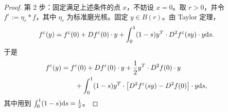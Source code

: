 \documentclass[../../main.tex]{subfiles}%
\begin{document}
\begin{proof}
第 2 步：固定满足上述条件的点 $x$，不妨设 $x=0$。取 $r>0$，并令 $f^{\varepsilon}:=\eta_{\varepsilon}*f$，其中 $\eta_{\varepsilon}$ 为标准磨光核。固定 $y\in B(r)$。由 Taylor 定理，
\begin{align*}
f^{\varepsilon}(y)=f^{\varepsilon}(0)+Df^{\varepsilon}(0)\cdot y+\int_{0}^{1}(1-s)y^{T}\cdot D^{2}f^{\varepsilon}(sy)\cdot y\mathrm{d} s.
\end{align*}
于是
\begin{align*}
f^{\varepsilon}(y)&=f^{\varepsilon}(0)+Df^{\varepsilon}(0)\cdot y+\frac{1}{2}y^{T}\cdot D^{2}f(0)\cdot y\\
&\qquad+\int_{0}^{1}(1-s)y^{T}\cdot\bigl[D^{2}f^{\varepsilon}(sy)-D^{2}f(0)\bigr]\cdot y\mathrm{d} s,
\end{align*}
其中用到 $\int_{0}^{1}(1-s)\mathrm{d} s=\frac{1}{2}$。


\end{proof}
\end{document}
